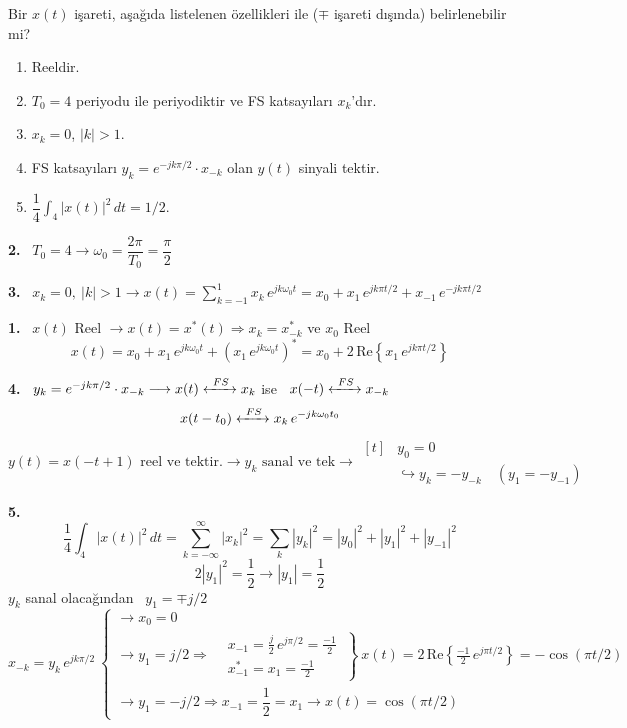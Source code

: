 \documentclass[11pt,a4paper]{article}
\begin{document}
\begin{ornek}
Bir $x(t)$ işareti, aşağıda listelenen özellikleri ile ($\mp$ işareti dışında) belirlenebilir mi?
\begin{enumerate}[label=\arabic*.]
  \item Reeldir.
  \item $T_0 = 4$ periyodu ile periyodiktir ve FS katsayıları $x_k$'dır.
  \item $x_k = 0$, $|k| > 1$.
  \item FS katsayıları $y_k = e^{-jk\pi/2}\cdot x_{-k}$ olan $y(t)$ sinyali tektir.
  \item $\dfrac{1}{4}\displaystyle\int_{4} |x(t)|^2\,dt = 1/2$.
\end{enumerate}
\end{ornek}
\begin{cozum}
\textbf{2.} \ $T_0 = 4 \longrightarrow \omega_0 = \dfrac{2\pi}{T_0} = \dfrac{\pi}{2}$

\textbf{3.} \ $x_k = 0, \ |k| > 1 \longrightarrow x(t) = \displaystyle\sum_{k=-1}^{1} x_k\,e^{jk\omega_0 t} = x_0 + x_1\,e^{jk\pi t/2} + x_{-1}\,e^{-jk\pi t/2}$

\textbf{1.} \ $x(t)$ Reel $\longrightarrow x(t) = x^{*}(t) \Rightarrow x_k = x_{-k}^{*}$ ve $x_0$ Reel
\[ x(t) = x_0 + x_1\,e^{jk\omega_0 t} + \left(x_1\,e^{jk\omega_0 t}\right)^{*} = x_0 + 2\,\mathrm{Re}\left\{x_1\,e^{jk\pi t/2}\right\} \]

\textbf{4.} \ $y_k = e^{-jk\pi/2}\cdot x_{-k} \longrightarrow x(t) \xleftrightarrow{\ FS\ } x_k$ ise \ $x(-t) \xleftrightarrow{\ FS\ } x_{-k}$
\[ x(t - t_0) \xleftrightarrow{\ FS\ } x_k\,e^{-jk\omega_0 t_0} \]
\[ y(t) = x(-t+1) \text{ reel ve tektir.} \longrightarrow y_k \text{ sanal ve tek} \longrightarrow \begin{aligned}[t] & y_0 = 0 \\ & \hookrightarrow y_k = -y_{-k} \quad (y_1 = -y_{-1}) \end{aligned} \]

\textbf{5.}
\[ \frac{1}{4}\int_{4} |x(t)|^2\,dt = \sum_{k=-\infty}^{\infty} |x_k|^2 = \sum_{k} |y_k|^2 = |y_0|^2 + |y_1|^2 + |y_{-1}|^2 \]
\[ 2|y_1|^2 = \frac{1}{2} \longrightarrow |y_1| = \frac{1}{2} \]
$y_k$ sanal olacağından \ $y_1 = \mp j/2$
\[ x_{-k} = y_k\,e^{jk\pi/2}\ \begin{cases}
  \longrightarrow x_0 = 0 \\[2mm]
  \longrightarrow y_1 = j/2 \Rightarrow \left.\begin{aligned} & x_{-1} = \frac{j}{2}\,e^{j\pi/2} = \frac{-1}{2} \\ & x_{-1}^{*} = x_1 = \frac{-1}{2} \end{aligned}\ \right\}\ x(t) = 2\,\mathrm{Re}\left\{\frac{-1}{2}\,e^{j\pi t/2}\right\} = -\cos(\pi t/2) \\[6mm]
  \longrightarrow y_1 = -j/2 \Rightarrow x_{-1} = \dfrac{1}{2} = x_1 \longrightarrow x(t) = \cos(\pi t/2)
\end{cases} \]
\end{cozum}
\end{document}
